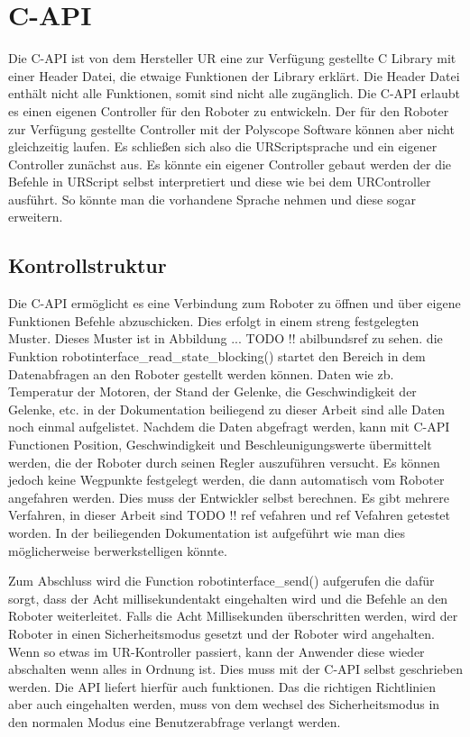 \section{C-API}
\label{sec:rest_prinzip_gru}

Die C-API ist von dem Hersteller UR eine zur Verfügung gestellte C Library mit einer Header Datei, die etwaige Funktionen der Library erklärt. Die Header Datei enthält nicht alle Funktionen, somit sind nicht alle zugänglich. Die C-API erlaubt es einen eigenen Controller für den Roboter zu entwickeln. Der für den Roboter zur Verfügung gestellte Controller mit der Polyscope Software können aber nicht gleichzeitig laufen. Es schließen sich also die URScriptsprache und ein eigener Controller zunächst aus. Es könnte ein eigener Controller gebaut werden der die Befehle in URScript selbst interpretiert und diese wie bei dem URController ausführt. So könnte man die vorhandene Sprache nehmen und diese sogar erweitern.

\subsection{Kontrollstruktur}
\label{capi_control_loop_gru}

Die C-API ermöglicht es eine Verbindung zum Roboter zu öffnen und über eigene Funktionen Befehle abzuschicken. Dies erfolgt in einem streng festgelegten Muster. Dieses Muster ist in Abbildung ... TODO !! abilbundsref zu sehen. 
die Funktion robotinterface_read_state_blocking() startet den Bereich in dem Datenabfragen an den Roboter gestellt werden können. Daten wie zb. Temperatur der Motoren, der Stand der Gelenke, die Geschwindigkeit der Gelenke, etc. in der Dokumentation beiliegend zu dieser Arbeit sind alle Daten noch einmal aufgelistet. Nachdem die Daten abgefragt werden, kann mit C-API Functionen Position, Geschwindigkeit und Beschleunigungswerte übermittelt werden, die der Roboter durch seinen Regler auszuführen versucht.
Es können jedoch keine Wegpunkte festgelegt werden, die dann automatisch vom Roboter angefahren werden. Dies muss der Entwickler selbst 
berechnen. Es gibt mehrere Verfahren, in dieser Arbeit sind TODO !! ref vefahren und ref Vefahren getestet worden. In der beiliegenden Dokumentation ist aufgeführt wie man dies möglicherweise berwerkstelligen könnte.

Zum Abschluss wird die Function robotinterface_send() aufgerufen die dafür sorgt, dass der Acht millisekundentakt eingehalten wird und die Befehle an den Roboter weiterleitet. Falls die Acht Millisekunden überschritten werden, wird der Roboter in einen Sicherheitsmodus gesetzt
und der Roboter wird angehalten.\\
Wenn so etwas im UR-Kontroller passiert, kann der Anwender diese wieder abschalten wenn alles in Ordnung ist. Dies muss mit der C-API selbst geschrieben werden. Die API liefert hierfür auch funktionen. Das die richtigen Richtlinien aber auch eingehalten werden, muss von dem wechsel des Sicherheitsmodus in den normalen Modus eine Benutzerabfrage verlangt werden.

